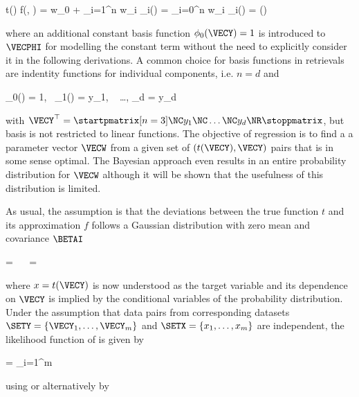     \startformula
        t(\VECY) \approx f(\VECY, \VECW) = w_0 + \sum_{i=1}^n w_i \phi_i(\VECY)
            = \sum_{i=0}^n w_i \phi_i(\VECY) = \VECPHI(\VECY) \VECW
    \stopformula

    where an additional constant basis function $\phi_0(\VECY) = 1$ is
    introduced to $\VECPHI$ for modelling the constant term without the need to
    explicitly consider it in the following derivations. A common choice for
    basis functions in retrievals are indentity functions for individual
    components, i.e. $n = d$ and

    \startformula
        \phi_0(\VECY) = 1,~ \phi_1(\VECY) = y_1, ~ \dots, \phi_d = y_d
    \stopformula

    with $\VECY^\top = \startpmatrix[n=3] \NC y_1 \NC \dots \NC y_d \NR \stoppmatrix$,
    but basis is not restricted to linear functions. The objective of
    regression is to find a a parameter vector $\VECW$ from a given set of
    $(t(\VECY), \VECY)$ pairs that is in some sense optimal. The Bayesian
    approach even results in an entire probability distribution for $\VECW$
    although it will be shown that the usefulness of this distribution is
    limited.

    As usual, the assumption is that the deviations between the true function
    $t$ and its approximation $f$ follows a Gaussian distribution with zero
    mean and covariance $\BETAI$

    \placeformula
    \startformula
    \startalign[n=3,align={left,right,left}]
        \NC \NC {} = \NC
                 \NR
        \NC \Rightarrow~~ \NC {} = \NC
             \EQCOMMA {}
    \stopalign
    \stopformula

    where $x = t(\VECY)$ is now understood as the target variable and its
    dependence on $\VECY$ is implied by the conditional variables of the
    probability distribution. Under the assumption that data pairs from
    corresponding datasets $\SETY = \{ \VECY_1, \dots, \VECY_m \}$ and $\SETX
    = \{ x_1, \dots, x_m \}$ are independent, the likelihood function of
    is given by

    \startformula
        \RLIKELIHOOD = \prod_{i=1}^{m} 
    \stopformula
    
    using  or alternatively by

